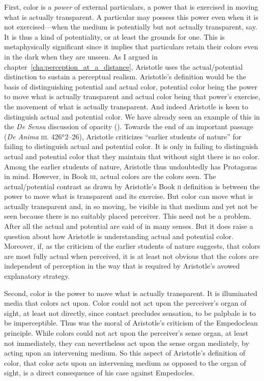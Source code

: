 First, color is a \emph{power} of external particulars, a power that is exercised in moving what is actually transparent. A particular may possess this power even when it is not exercised---when the medium is potentially but not actually transparent, say. It is thus a kind of potentiality, or at least the grounds for one. This is metaphysically significant since it implies that particulars retain their colors even in the dark when they are unseen. As I argued in chapter~\ref{cha:perception_at_a_distance}, Aristotle uses the actual/potential distinction to sustain a perceptual realism. Aristotle's definition would be the basis of distinguishing potential and actual color, potential color being the power to move what is actually transparent and actual color being that power's exercise, the movement of what is actually transparent. And indeed Aristotle is keen to distinguish actual and potential color. We have already seen an example of this in the \emph{De Sensu} discussion of opacity (\pageref{actual_potential}). Towards the end of an important passage (\emph{De Anima} \textsc{iii}. 426\( ^{a} \)2--26), Aristotle criticizes ``earlier students of nature'' for failing to distinguish actual and potential color. It is only in failing to distinguish actual and potential color that they maintain that without sight there is no color. Among the earlier students of nature, Aristotle thus undoubtedly has Protagoras in mind. However, in Book \textsc{iii}, actual colors are the colors seen. The actual/potential contrast as drawn by Aristotle's Book \textsc{ii} definition is between the power to move what is transparent and its exercise. But color can move what is actually transparent and, in so moving, be visible in that medium and yet not be seen because there is no suitably placed perceiver. This need not be a problem. After all the actual and potential are said of in many senses. But it does raise a question about how Aristotle is understanding actual and potential color. Moreover, if, as the criticism of the earlier students of nature suggests, that colors are most fully actual when perceived, it is at least not obvious that the colors are independent of perception in the way that is required by Aristotle's avowed explanatory strategy.

Second, color is the power to move what is actually transparent. It is illuminated media that colors act upon. Color could not act upon the perceiver's organ of sight, at least not directly, since contact precludes sensation, to be palpbale is to be imperceptible. Thus was the moral of Aristotle's criticism of the Empedoclean principle. While colors could not act upon the perceiver's sense organ, at least not immediately, they can nevertheless act upon the sense organ mediately, by acting upon an intervening medium. So this aspect of Aristotle's definition of color, that color acts upon an intervening medium as opposed to the organ of sight, is a direct consequence of his case against Empedocles.

